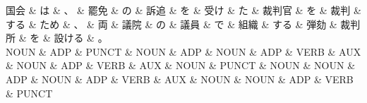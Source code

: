 \documentclass[tikz,border=5pt]{standalone}
\begin{document}
\normalsize
\begin{dependency}[edge unit distance=10.0pt]
    \begin{deptext}[column sep=1em]
        国会 \& は \& 、 \& 罷免 \& の \& 訴追 \& を \& 受け \& た \& 裁判官 \& を \& 裁判 \& する \& ため \& 、 \& 両 \& 議院 \& の \& 議員 \& で \& 組織 \& する \& 弾劾 \& 裁判所 \& を \& 設ける \& 。\\
        NOUN \& ADP \& PUNCT \& NOUN \& ADP \& NOUN \& ADP \& VERB \& AUX \& NOUN \& ADP \& VERB \& AUX \& NOUN \& PUNCT \& NOUN \& NOUN \& ADP \& NOUN \& ADP \& VERB \& AUX \& NOUN \& NOUN \& ADP \& VERB \& PUNCT\\
    \end{deptext}
\end{dependency}
\end{document}

